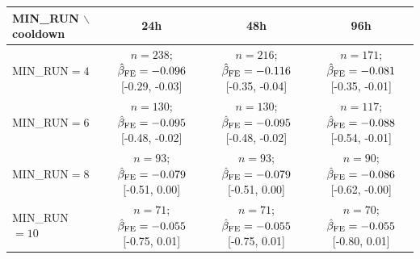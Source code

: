 \begin{tabular}{@{}lccc@{}}
\toprule
MIN\_RUN $\backslash$ cooldown & 24h & 48h & 96h \\
\midrule
MIN\_RUN$=4$ & $n=238$; $\hat\beta_{\rm FE}=-0.096$ [-0.29, -0.03] & $n=216$; $\hat\beta_{\rm FE}=-0.116$ [-0.35, -0.04] & $n=171$; $\hat\beta_{\rm FE}=-0.081$ [-0.35, -0.01] \\
MIN\_RUN$=6$ & $n=130$; $\hat\beta_{\rm FE}=-0.095$ [-0.48, -0.02] & $n=130$; $\hat\beta_{\rm FE}=-0.095$ [-0.48, -0.02] & $n=117$; $\hat\beta_{\rm FE}=-0.088$ [-0.54, -0.01] \\
MIN\_RUN$=8$ & $n=93$; $\hat\beta_{\rm FE}=-0.079$ [-0.51, 0.00] & $n=93$; $\hat\beta_{\rm FE}=-0.079$ [-0.51, 0.00] & $n=90$; $\hat\beta_{\rm FE}=-0.086$ [-0.62, -0.00] \\
MIN\_RUN$=10$ & $n=71$; $\hat\beta_{\rm FE}=-0.055$ [-0.75, 0.01] & $n=71$; $\hat\beta_{\rm FE}=-0.055$ [-0.75, 0.01] & $n=70$; $\hat\beta_{\rm FE}=-0.055$ [-0.80, 0.01] \\
\bottomrule
\end{tabular}